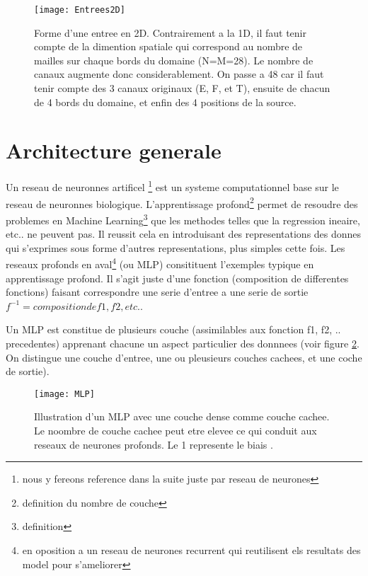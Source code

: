 \begin{figure}[!h]
\centering
\texttt{[image: Entrees2D]} 
\decoRule
\caption[Entrees2D]{Forme d'une entree en 2D. Contrairement a la 1D, il faut tenir compte de la dimention spatiale qui correspond au nombre de mailles sur chaque bords du domaine (N=M=28). Le nombre de canaux augmente donc considerablement. On passe a 48 car il faut tenir compte des 3 canaux originaux (E, F, et T), ensuite de chacun de 4 bords du domaine, et enfin des 4 positions de la source.}
\label{fig:Entrees2D}
\end{figure}


\section{Architecture generale}

Un reseau de neuronnes artificel \footnote{nous y fereons reference dans la suite juste par reseau de neurones} est un systeme computationnel base sur le reseau de neuronnes biologique. L'apprentissage profond\footnote{definition du nombre de couche} permet de resoudre des problemes en Machine Learning\footnote{definition} que les methodes telles que la regression ineaire, etc.. ne peuvent pas. Il reussit cela en introduisant des representations des donnes qui s'exprimes sous forme d'autres representations, plus simples cette fois. Les reseaux profonds en aval\footnote{en oposition a un reseau de neurones recurrent qui reutilisent els resultats des model pour s'ameliorer} (ou MLP) consitituent l'exemples typique en apprentissage profond. Il s'agit juste d'une fonction (composition de differentes fonctions) faisant correspondre une serie d'entree a une serie de sortie $f^{-1} = composition de f1, f2, etc.$.

Un MLP est constitue de plusieurs couche (assimilables aux fonction f1, f2, .. precedentes) apprenant chacune un aspect particulier des donnnees (voir figure \ref{fig:MLP}. On distingue une couche d'entree, une ou pleusieurs couches cachees, et une coche de sortie).


\begin{figure}[!h]
\centering
\texttt{[image: MLP]} 
\decoRule
\caption[MLP]{Illustration d'un MLP avec une couche dense comme couche cachee. Le noombre de couche cachee peut etre elevee ce qui conduit aux reseaux de neurones profonds. Le 1 represente le biais \parencite[286]{Reference8}.}
\label{fig:MLP}
\end{figure}


